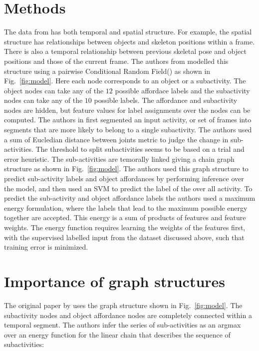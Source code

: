 \documentclass{article} %
\begin{document}
\section{Methods}
The data from \cite{koppula2013detectingactivitiesrgbd} has both temporal and spatial structure. For example, the spatial structure has relationships between objects and skeleton positions within a frame. There is also a temporal relationship between previous skeletal pose and object positions and those of the current frame. The authors from \cite{koppula2013detectingactivitiesrgbd} modelled this structure using a pairwise Conditional Random Field(\cite{sutton06introduction}) as shown in 
Fig.~\ref{fig:model}. 
Here each node corresponds to an object or a subactivity. The object nodes can take any of the $12$ possible affordace labels and the subactivity nodes can take any of the $10$ possible labels. The affordance and subactivity nodes are hidden, but feature values for label assignments over the nodes can be computed. The authors in \cite{koppula2013detectingactivitiesrgbd} first segmented an input activity, or set of frames into segments that are more likely to belong to a single subactivity. The authors used a sum of Eucledian distance between joints metric to judge the change in sub-activities. The threshold to split subactivities seems to be based on a trial and error heuristic. The sub-activities are temorally linked giving a chain graph structure as shown in Fig.~\ref{fig:model}. The authors used this graph structure to predict sub-activity labels and object affordances by performing inference over the model, and then used an SVM to predict the label of the over all activity. To predict the sub-activity and object affordance labels the authors used a maximum energy formulation, where the labels that lead to the maximum possible energy together are accepted. This energy is a sum of products of features and feature weights. The energy function requires learning the weights of the features first, with the supervised labelled input from the dataset discussed above, such that training error is minimized. 


\section{Importance of graph structures}
The original paper by \cite{koppula2013detectingactivitiesrgbd} uses the graph structure shown in Fig.~\ref{fig:model}. The subactivity nodes and object affordance nodes are completely connected within a temporal segment. The authors infer the series of sub-activities as an argmax over an energy function for the linear chain that describes the sequence of subactivities:
\end{document}
